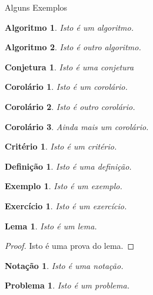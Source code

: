 \documentclass[12pt,reqno, twoside]{amsbook}
\makeatletter
\def\section{\@startsection{section}{1}%
      \z@{.5\linespacing\@plus.7\linespacing}{.25\linespacing}%
      {\normalfont\bfseries\flushleft}}
\theoremstyle{plain}
\newtheorem{algorithm}{Algoritmo}[chapter]
\newtheorem{conjecture}{Conjetura}[chapter]
\newtheorem{corollary}{Corol\'{a}rio}[chapter]
\newtheorem{criterion}{Crit\'{e}rio}[chapter]
\newtheorem{definition}{Defini\c{c}\~{a}o}[chapter]
\newtheorem{example}{Exemplo}[chapter]
\newtheorem{exercise}{Exerc\'{i}cio}[chapter]
\newtheorem{lemma}{Lema}[chapter]
\newtheorem{notation}{Nota\c{c}\~{a}o}[chapter]
\newtheorem{problem}{Problema}[chapter]
\numberwithin{equation}{chapter}
\numberwithin{section}{chapter}
\makeatother
\begin{document}
\section{Alguns Exemplos}

\begin{algorithm}
Isto \'{e} um algoritmo.
\end{algorithm}

\begin{algorithm}
Isto \'{e} outro algoritmo.
\end{algorithm}

\begin{conjecture}
Isto \'{e} uma conjetura
\end{conjecture}

\begin{corollary}
Isto \'{e} um corol\'{a}rio.
\end{corollary}

\begin{corollary}
Isto \'{e} outro corol\'{a}rio.
\end{corollary}

\begin{corollary}
Ainda mais um corol\'{a}rio.
\end{corollary}

\begin{criterion}
Isto \'{e} um crit\'{e}rio.
\end{criterion}

\begin{definition}
Isto \'{e} uma defini\c{c}\~{a}o.
\end{definition}

\begin{example}
Isto \'{e} um exemplo.
\end{example}

\begin{exercise}
Isto \'{e} um exerc\'{i}cio.
\end{exercise}

\begin{lemma}
Isto \'{e} um lema.
\end{lemma}

\begin{proof}
Isto \'{e} uma prova do lema.
\end{proof}

\begin{notation}
Isto \'{e} uma nota\c{c}\~{a}o.
\end{notation}

\begin{problem}
Isto \'{e} um problema.
\end{problem}
\end{document}
